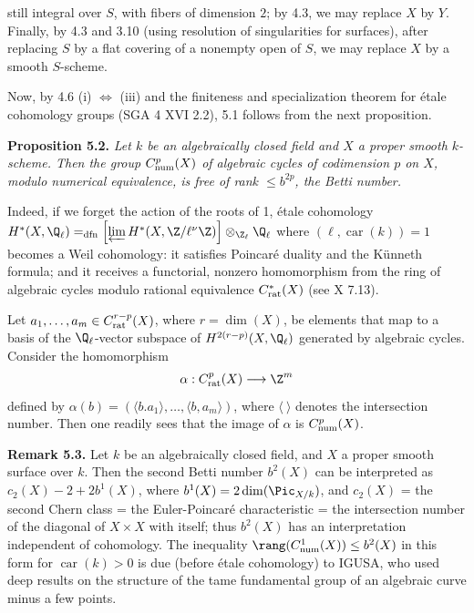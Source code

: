%
still integral over \(S\), with fibers of dimension \(2\); by 4.3, we may replace \(X\) by \(Y\). Finally, by 4.3 and 3.10 (using resolution of singularities for surfaces), after replacing \(S\) by a flat covering of a nonempty open of \(S\), we may replace \(X\) by a smooth \(S\)-scheme.

Now, by 4.6 (i) \(\Longleftrightarrow\) (iii) and the finiteness and specialization theorem for \'etale cohomology groups (SGA 4 XVI 2.2), 5.1 follows from the next proposition.

\textbf{Proposition 5.2.} \emph{Let \(k\) be an algebraically closed field and \(X\) a proper smooth \(k\)-scheme. Then the group \(C^p_{\rm num}(X)\) of algebraic cycles of codimension \(p\) on \(X\), modulo numerical equivalence, is free of rank \(\le b^{2p}\), the Betti number.}

Indeed, if we forget the action of the roots of 1, \'etale cohomology \(H^*(X,\Q_\ell)=_{\rm dfn}\left[\varprojlim H^*(X,\Z/\ell^\nu\Z)\right]\otimes_{\Z_\ell}\Q_\ell\) where \((\ell,\operatorname{car}(k))=1\) becomes a Weil cohomology: it satisfies Poincar\'e duality and the K\"unneth formula; and it receives a functorial, nonzero homomorphism from the ring of algebraic cycles modulo rational equivalence \(C^*_{\rm rat}(X)\) (see X 7.13).

Let \(a_1,\ldots,a_m\in C^{r-p}_{\rm rat}(X)\), where \(r=\dim(X)\), be elements that map to a basis of the \(\Q_\ell\)-vector subspace of \(H^{2(r-p)}(X,\Q_\ell)\) generated by algebraic cycles. Consider the homomorphism
\[
   \alpha:C^p_{\rm rat}(X)\longrightarrow \Z^m
\]
defined by \(\alpha(b)=(\langle b.a_1\rangle,\ldots,\langle b,a_m\rangle)\), where \(\langle\ \rangle\) denotes the intersection number. Then one readily sees that the image of \(\alpha\) is \(C^p_{\rm num}(X)\).

%
\textbf{Remark 5.3.} Let \(k\) be an algebraically closed field, and \(X\) a proper smooth surface over \(k\). Then the second Betti number \(b^2(X)\) can be interpreted as \(c_2(X)-2+2b^1(X)\), where \(b^1(X)=2\dim(\Pic_{X/k})\), and \(c_2(X)\) = the second Chern class = the Euler-Poincar\'e characteristic = the intersection number of the diagonal of \(X\times X\) with itself; thus \(b^2(X)\) has an interpretation independent of cohomology. The inequality \(\rang(C^1_{\rm num}(X))\le b^2(X)\) in this form for \(\operatorname{car}(k)>0\) is due (before \'etale cohomology) to IGUSA, who used deep results on the structure of the tame fundamental group of an algebraic curve minus a few points.

